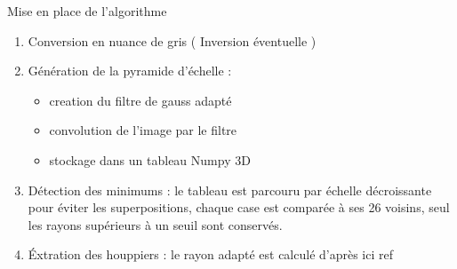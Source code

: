 \documentclass{beamer}
\begin{document}
\begin{frame}
	Mise en place de l'algorithme
	\begin{enumerate}
		\item Conversion en nuance de gris ( Inversion éventuelle ) 
		\item Génération de la pyramide d'échelle : 
		\begin{itemize}
			\item creation du filtre de gauss adapté
			\item convolution de l'image par le filtre 
			\item stockage dans un tableau Numpy 3D
		\end{itemize}
		\item Détection des minimums : le tableau est parcouru par échelle décroissante pour éviter les superpositions, chaque case est comparée à ses 26 voisins, seul les rayons supérieurs à un seuil sont conservés.  
		\item \'{E}xtration des houppiers : le rayon adapté est calculé d'après ici ref 
	\end{enumerate}	
\end{frame}
\end{document}
